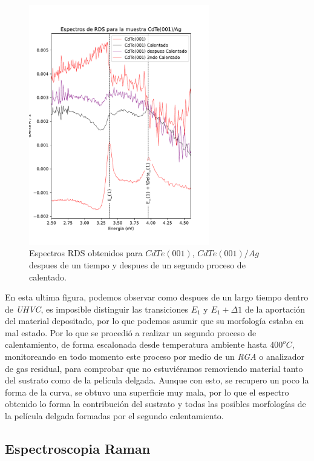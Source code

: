 \begin{figure}[H]
    \centering
    \includegraphics[width=0.7\textwidth]{figures/chap4/cdte-ag/rds-results/ag_rds_3.pdf}
        \caption{Espectros RDS obtenidos para $CdTe(001)$, $CdTe(001)/Ag$ despues de un tiempo y despues de un segundo proceso de calentado.}
    \label{fig:cdte-rds-3}
\end{figure}

En esta ultima figura, podemos observar como despues de un largo tiempo dentro de \textit{UHVC}, es imposible distinguir las transiciones $E_{1}$ y $E_{1}+\Delta1$ de la aportación del material depositado, por lo que podemos asumir que su morfología estaba en mal estado. Por lo que se procedió a realizar un segundo proceso de calentamiento, de forma escalonada desde temperatura ambiente hasta $400^{o}C$, monitoreando en todo momento este proceso por medio de un \textit{RGA} o analizador de gas residual, para comprobar que no estuviéramos removiendo material tanto del sustrato como de la película delgada. Aunque con esto, se recupero un poco la forma de la curva, se obtuvo una superficie muy mala, por lo que el espectro obtenido lo forma la contribución del sustrato y todas las posibles morfologías de la película delgada formadas por el segundo calentamiento.

\subsection{Espectroscopia Raman}
\label{sec:chap4-cdte-raman}

